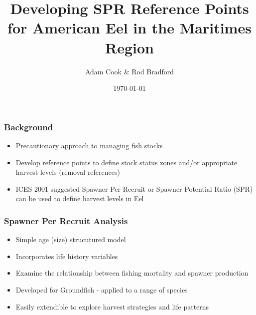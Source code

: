 \documentclass{beamer}
\title[SPR for American Eel]{Developing SPR Reference Points for American Eel in the Maritimes Region\\ }
\author{Adam Cook \& Rod Bradford} %
\institute[Population Ecology Division]
{Bedford Institute of Oceanography \\ %
\medskip
\textit{Adam.Cook@dfo-mpo.gc.ca} %
}
\date{\today} %
\begin{document}
\begin{frame}
	\titlepage %

\end{frame}


%
\begin{frame}
\frametitle{Background}
%
\begin{itemize}
	\item Precautionary approach to managing fish stocks
	\item Develop reference points to define stock status zones and/or appropriate harvest levels (removal references)
	\item ICES 2001 suggested Spawner Per Recruit or Spawner Potential Ratio (SPR) can be used to define harvest levels in Eel
\end{itemize}

\end{frame}

\begin{frame}

	\frametitle{Spawner Per Recruit Analysis}

	\begin{itemize}
		\item Simple age (size) strucutured model
		\item Incorporates life history variables
		\item Examine the relationship between fishing mortality and spawner production 
		\item Developed for Groundfish - applied to a range of species
		\item Easily extendible to explore harvest strategies and life patterns
	\end{itemize}


\end{frame}
\end{document}
